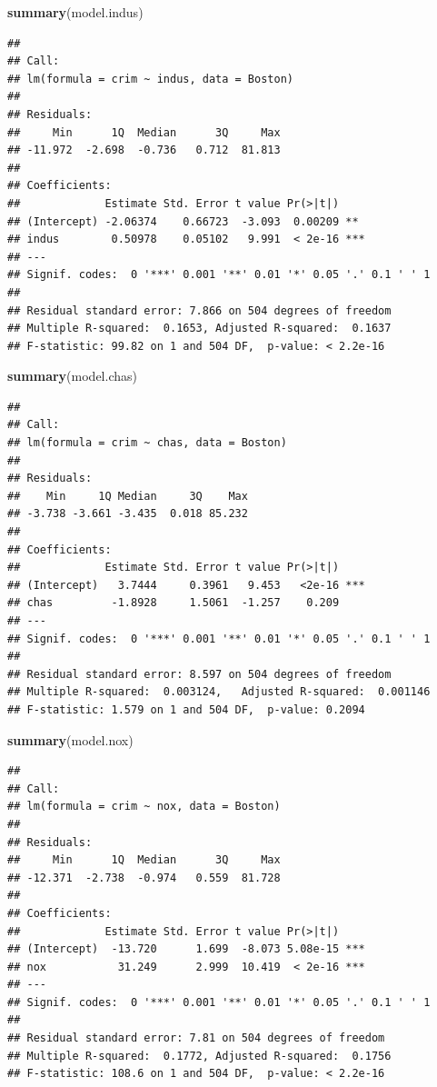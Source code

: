 \documentclass[]{article}
\newenvironment{Shaded}{\begin{snugshade}}{\end{snugshade}}
\newcommand{\KeywordTok}[1]{\textcolor[rgb]{0.13,0.29,0.53}{\textbf{#1}}}
\newcommand{\NormalTok}[1]{#1}
\begin{document}
\begin{Shaded}
\begin{Highlighting}[]
\KeywordTok{summary}\NormalTok{(model.indus)}
\end{Highlighting}
\end{Shaded}

\begin{verbatim}
## 
## Call:
## lm(formula = crim ~ indus, data = Boston)
## 
## Residuals:
##     Min      1Q  Median      3Q     Max 
## -11.972  -2.698  -0.736   0.712  81.813 
## 
## Coefficients:
##             Estimate Std. Error t value Pr(>|t|)    
## (Intercept) -2.06374    0.66723  -3.093  0.00209 ** 
## indus        0.50978    0.05102   9.991  < 2e-16 ***
## ---
## Signif. codes:  0 '***' 0.001 '**' 0.01 '*' 0.05 '.' 0.1 ' ' 1
## 
## Residual standard error: 7.866 on 504 degrees of freedom
## Multiple R-squared:  0.1653, Adjusted R-squared:  0.1637 
## F-statistic: 99.82 on 1 and 504 DF,  p-value: < 2.2e-16
\end{verbatim}

\begin{Shaded}
\begin{Highlighting}[]
\KeywordTok{summary}\NormalTok{(model.chas)}
\end{Highlighting}
\end{Shaded}

\begin{verbatim}
## 
## Call:
## lm(formula = crim ~ chas, data = Boston)
## 
## Residuals:
##    Min     1Q Median     3Q    Max 
## -3.738 -3.661 -3.435  0.018 85.232 
## 
## Coefficients:
##             Estimate Std. Error t value Pr(>|t|)    
## (Intercept)   3.7444     0.3961   9.453   <2e-16 ***
## chas         -1.8928     1.5061  -1.257    0.209    
## ---
## Signif. codes:  0 '***' 0.001 '**' 0.01 '*' 0.05 '.' 0.1 ' ' 1
## 
## Residual standard error: 8.597 on 504 degrees of freedom
## Multiple R-squared:  0.003124,   Adjusted R-squared:  0.001146 
## F-statistic: 1.579 on 1 and 504 DF,  p-value: 0.2094
\end{verbatim}

\begin{Shaded}
\begin{Highlighting}[]
\KeywordTok{summary}\NormalTok{(model.nox)}
\end{Highlighting}
\end{Shaded}

\begin{verbatim}
## 
## Call:
## lm(formula = crim ~ nox, data = Boston)
## 
## Residuals:
##     Min      1Q  Median      3Q     Max 
## -12.371  -2.738  -0.974   0.559  81.728 
## 
## Coefficients:
##             Estimate Std. Error t value Pr(>|t|)    
## (Intercept)  -13.720      1.699  -8.073 5.08e-15 ***
## nox           31.249      2.999  10.419  < 2e-16 ***
## ---
## Signif. codes:  0 '***' 0.001 '**' 0.01 '*' 0.05 '.' 0.1 ' ' 1
## 
## Residual standard error: 7.81 on 504 degrees of freedom
## Multiple R-squared:  0.1772, Adjusted R-squared:  0.1756 
## F-statistic: 108.6 on 1 and 504 DF,  p-value: < 2.2e-16
\end{verbatim}
\end{document}
